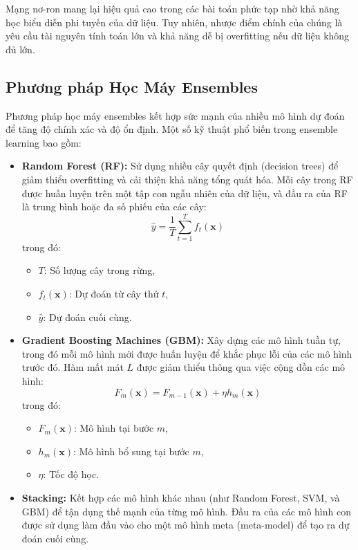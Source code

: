 Mạng nơ-ron mang lại hiệu quả cao trong các bài toán phức tạp nhờ khả năng học biểu diễn phi tuyến của dữ liệu. Tuy nhiên, nhược điểm chính của chúng là yêu cầu tài nguyên tính toán lớn và khả năng dễ bị overfitting nếu dữ liệu không đủ lớn.

\subsection{Phương pháp Học Máy Ensembles}
Phương pháp học máy ensembles kết hợp sức mạnh của nhiều mô hình dự đoán để tăng độ chính xác và độ ổn định. Một số kỹ thuật phổ biến trong ensemble learning bao gồm:

\begin{itemize}
    \item \textbf{Random Forest (RF):} Sử dụng nhiều cây quyết định (decision trees) để giảm thiểu overfitting và cải thiện khả năng tổng quát hóa. Mỗi cây trong RF được huấn luyện trên một tập con ngẫu nhiên của dữ liệu, và đầu ra của RF là trung bình hoặc đa số phiếu của các cây:
    \[
    \hat{y} = \frac{1}{T} \sum_{t=1}^T f_t(\mathbf{x})
    \]
    trong đó:
    \begin{itemize}
        \item \(T\): Số lượng cây trong rừng,
        \item \(f_t(\mathbf{x})\): Dự đoán từ cây thứ \(t\),
        \item \(\hat{y}\): Dự đoán cuối cùng.
    \end{itemize}

    \item \textbf{Gradient Boosting Machines (GBM):} Xây dựng các mô hình tuần tự, trong đó mỗi mô hình mới được huấn luyện để khắc phục lỗi của các mô hình trước đó. Hàm mất mát \(L\) được giảm thiểu thông qua việc cộng dồn các mô hình:
    \[
    F_m(\mathbf{x}) = F_{m-1}(\mathbf{x}) + \eta h_m(\mathbf{x})
    \]
    trong đó:
    \begin{itemize}
        \item \(F_m(\mathbf{x})\): Mô hình tại bước \(m\),
        \item \(h_m(\mathbf{x})\): Mô hình bổ sung tại bước \(m\),
        \item \(\eta\): Tốc độ học.
    \end{itemize}

    \item \textbf{Stacking:} Kết hợp các mô hình khác nhau (như Random Forest, SVM, và GBM) để tận dụng thế mạnh của từng mô hình. Đầu ra của các mô hình con được sử dụng làm đầu vào cho một mô hình meta (meta-model) để tạo ra dự đoán cuối cùng.
\end{itemize}


